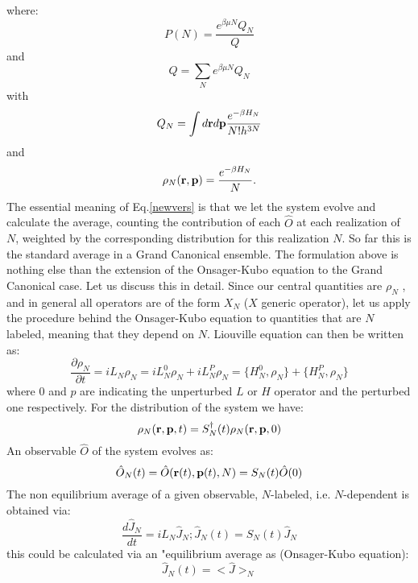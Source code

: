 \documentclass[aps,pre,preprint,unsortedaddress]{revtex4}
\begin{document}
where:
\begin{equation}
P(N)=\frac{e^{\beta\mu N}Q_{N}}{Q}
\end{equation}
and
\begin{equation}
Q=\sum_{N}e^{\beta\mu N}Q_{N}
\end{equation}
with
\begin{equation}
Q_{N}=\int d{\bf r}d{\bf p} \frac{e^{-\beta H_{N}}}{N!h^{3N}}
\end{equation}
and
\begin{equation}
\rho_{N}({\bf r,p})=\frac{e^{-\beta H_{N}}}{N}.
\end{equation}
The essential meaning of Eq.\ref{newvers} is that we let the system evolve and calculate the average, counting the contribution of each $\hat{O}$ at each realization of $N$, weighted by the corresponding distribution for this realization $N$. So far this is the standard average in a Grand Canonical ensemble. The formulation above is nothing else than the extension of the Onsager-Kubo equation to the Grand Canonical case.
Let us discuss this in detail. Since our central quantities are $\rho_{N}$ , and in general all operators are of the form $X_{N}$ ($X$ generic operator), let us apply the procedure behind the Onsager-Kubo equation to quantities that are $N$ labeled, meaning that they depend on $N$. Liouville equation can then be written as:
\begin{equation}
\frac{\partial\rho_{N}}{\partial t}=i L_{N}\rho_{N}=iL_{N}^{0}\rho_{N}+iL_{N}^{P}\rho_{N}=\{H_{N}^{0},\rho_{N}\}+\{H^{P}_{N},\rho_{N}\}
\label{liouville}
\end{equation}
where $0$ and $p$ are indicating the unperturbed $L$ or $H$ operator and the perturbed one respectively.
For the distribution of the system we have:
\begin{equation}
\rho_{N}({\bf r},{\bf p},t)=S^{\dagger}_{N}(t)\rho_{N}({\bf r},{\bf p},0)
\end{equation}
An observable $\hat{O}$ of the system evolves as:
\begin{equation}
\hat{O}_{N}(t)=\hat{O}({\bf r}(t),{\bf p}(t),N)=S_{N}(t)\hat{O}(0)
\end{equation}
The non equilibrium average of a given observable, $N$-labeled, i.e. $N$-dependent is obtained via:
\begin{equation}
\frac{d \hat{J}_{N}}{dt}=iL_{N}\hat{J}_{N};\hat{J}_{N}(t)=S_{N}(t)\hat{J}_{N}
\end{equation}
this could be calculated via an "equilibrium average as (Onsager-Kubo equation):
\begin{equation}
\hat{J}_{N}(t)=<\hat{J}>_{N}
\end{equation}
\end{document}
